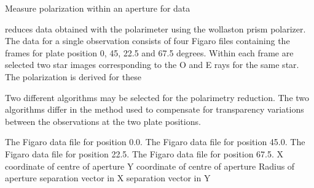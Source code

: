 \begin{manroutinedescription}
        Measure polarization within an aperture for {} data

        {} reduces data obtained with the {} {} polarimeter
        using the wollaston  prism polarizer. The data for a
        single observation consists of four Figaro files containing the
        frames for plate position 0, 45, 22.5 and 67.5 degrees. Within each
        frame are selected two star images corresponding to the O and E rays
        for the same star. The polarization is derived for these

        Two different algorithms may be selected for the polarimetry
        reduction. The two algorithms differ in the method used to
        compensate for transparency variations between the observations
        at the two plate positions.


\begin{manparametertable}
     The Figaro data file for %
position 0.0.
     The Figaro data file for %
position 45.0.
     The Figaro data file for %
position 22.5.
     The Figaro data file for %
position 67.5.
  X coordinate of centre of aperture
  Y coordinate of centre of aperture
     Radius of aperture
  {} separation vector %
in X
  {} separation vector %
in Y

\end{manparametertable}
\end{manroutinedescription}

